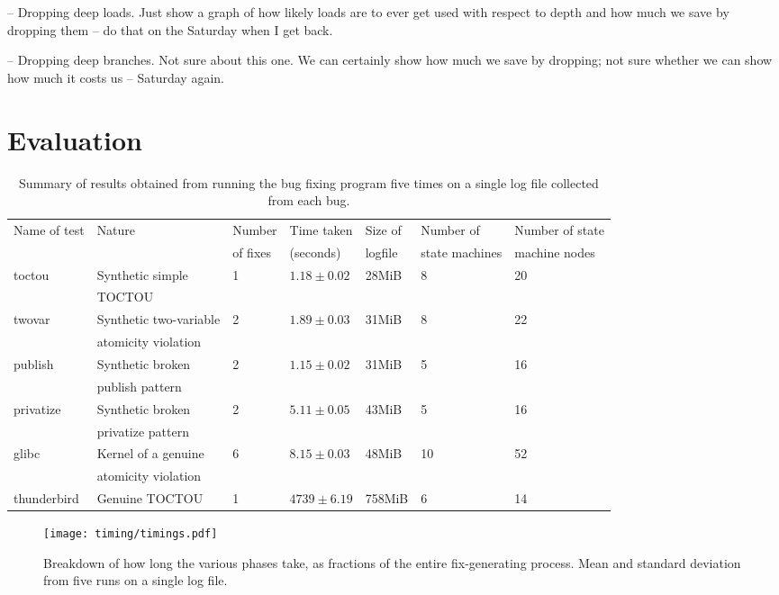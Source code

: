 \documentclass[10pt,twocolumn,preprint,natbib,authoryear]{sigplanconf}
\begin{document}
-- Dropping deep loads.  Just show a graph of how likely loads are to
ever get used with respect to depth and how much we save by dropping
them -- do that on the Saturday when I get back.

-- Dropping deep branches.  Not sure about this one.  We can certainly
show how much we save by dropping; not sure whether we can show how
much it costs us -- Saturday again.

\section{Evaluation}

\begin{table*}
\begin{tabular}{lllllll}
Name of test & Nature & Number & Time taken & Size of & Number of & Number of state\\
 & & of fixes & (seconds) & logfile & state machines & machine nodes\\
\hline
toctou & Synthetic simple & 1 & $1.18 \pm 0.02$ & 28MiB & 8 & 20\\
       & TOCTOU & & & \\
twovar & Synthetic two-variable & 2 & $1.89 \pm 0.03$ & 31MiB & 8 & 22\\
       & atomicity violation &&&\\
publish & Synthetic broken & 2 & $1.15 \pm 0.02$ & 31MiB & 5 & 16 \\
        & publish pattern & & & \\
privatize & Synthetic broken & 2 & $5.11 \pm 0.05$ & 43MiB & 5 & 16 \\
          & privatize pattern & & & \\
\hline
glibc & Kernel of a genuine & 6 & $8.15 \pm 0.03$ & 48MiB & 10 & 52\\
      & atomicity violation & & & \\
\hline
thunderbird & Genuine TOCTOU & 1 & $4739 \pm 6.19$ & 758MiB & 6 & 14
\end{tabular}
\caption{Summary of results obtained from running the bug fixing
  program five times on a single log file collected from each bug.}
\end{table*}

\begin{figure*}
\texttt{[image: timing/timings.pdf]}
\caption{Breakdown of how long the various phases take, as fractions
  of the entire fix-generating process.  Mean and standard deviation
  from five runs on a single log file.}
\end{figure*}
\end{document}
